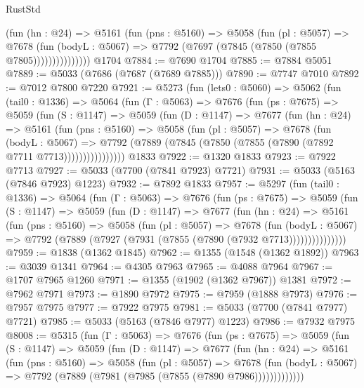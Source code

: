 \begin{lexlean}{RustStd}
\begin{coremodule}
                  (fun (hn : @24) =>
                  @5161
                    (fun (pns : @5160) =>
                    @5058
                      (fun (pl : @5057) =>
                      @7678
                        (fun (bodyL : @5067) =>
                        @7792 (@7697 (@7845 (@7850 (@7855 @7805)))))))))))))))
    @1704
@7884 := @7690 @1704
@7885 := @7884 @5051
@7889 := @5033 (@7686 (@7687 (@7689 @7885)))
@7890 := @7747 @7010
@7892 := @7012 @7800 @7220
@7921 := @5273
    (fun (lets0 : @5060) =>
    @5062
      (fun (tail0 : @1336) =>
      @5064
        (fun (Γ : @5063) =>
        @7676
          (fun (ps : @7675) =>
          @5059
            (fun (S : @1147) =>
            @5059
              (fun (D : @1147) =>
              @7677
                (fun (hn : @24) =>
                @5161
                  (fun (pns : @5160) =>
                  @5058
                    (fun (pl : @5057) =>
                    @7678
                      (fun (bodyL : @5067) =>
                      @7792 (@7889 (@7845 (@7850 (@7855 (@7890 (@7892 @7711 @7713))))))))))))))))
    @1833
@7922 := @1320 @1833
@7923 := @7922 @7713
@7927 := @5033 (@7700 (@7841 @7923) @7721)
@7931 := @5033 (@5163 (@7846 @7923) @1223)
@7932 := @7892 @1833
@7957 := @5297
    (fun (tail0 : @1336) =>
    @5064
      (fun (Γ : @5063) =>
      @7676
        (fun (ps : @7675) =>
        @5059
          (fun (S : @1147) =>
          @5059
            (fun (D : @1147) =>
            @7677
              (fun (hn : @24) =>
              @5161
                (fun (pns : @5160) =>
                @5058
                  (fun (pl : @5057) =>
                  @7678
                    (fun (bodyL : @5067) =>
                    @7792 (@7889 (@7927 (@7931 (@7855 (@7890 (@7932 @7713)))))))))))))))
@7959 := @1838 (@1362 @1845)
@7962 := @1355 (@1548 (@1362 @1892))
@7963 := @3039 @1341
@7964 := @4305 @7963
@7965 := @4088 @7964
@7967 := @1707 @7965 @1260
@7971 := @1355 (@1902 (@1362 @7967)) @1381
@7972 := @7962 @7971
@7973 := @1890 @7972
@7975 := @7959 (@1888 @7973)
@7976 := @7957 @7975
@7977 := @7922 @7975
@7981 := @5033 (@7700 (@7841 @7977) @7721)
@7985 := @5033 (@5163 (@7846 @7977) @1223)
@7986 := @7932 @7975
@8008 := @5315
    (fun (Γ : @5063) =>
    @7676
      (fun (ps : @7675) =>
      @5059
        (fun (S : @1147) =>
        @5059
          (fun (D : @1147) =>
          @7677
            (fun (hn : @24) =>
            @5161
              (fun (pns : @5160) =>
              @5058
                (fun (pl : @5057) =>
                @7678
                  (fun (bodyL : @5067) =>
                  @7792 (@7889 (@7981 (@7985 (@7855 (@7890 @7986)))))))))))))

\end{coremodule}
\end{lexlean}
